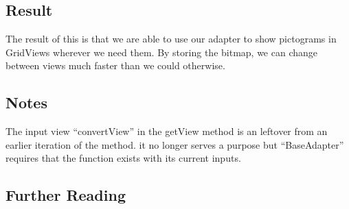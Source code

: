 \subsection*{Result}
The result of this is that we are able to use our adapter to show pictograms in GridViews wherever we need them.
By storing the bitmap, we can change between views much faster than we could otherwise.


\subsection*{Notes}
The input view ``convertView'' in the getView method is an leftover from an earlier iteration of the method. it no longer serves a purpose but ``BaseAdapter'' requires that the function exists with its current inputs.\\

\subsection*{Further Reading}
